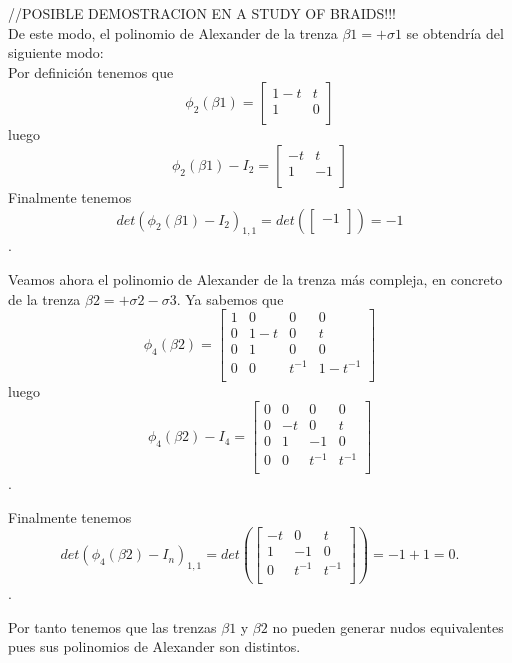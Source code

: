 \documentclass[14pt]{extarticle}
\begin{document}
//POSIBLE DEMOSTRACION EN A STUDY OF BRAIDS!!!\\

De este modo, el polinomio de Alexander de la trenza $\beta1 = +\sigma1$ se obtendría del siguiente modo:\\
Por definición tenemos que  
\[ \phi_{2} (\beta1) = \begin{bmatrix}
1-t & t  \\
1 & 0 \\
\end{bmatrix}\]
luego 
\[ \phi_{2} (\beta1) - I_{2}= \begin{bmatrix}
-t & t  \\
1 & -1 \\
\end{bmatrix}\]
Finalmente tenemos 
\[ det(\phi_{2} (\beta1) - I_{2})_{1,1} = det(\begin{bmatrix}
-1 \\
\end{bmatrix}) = -1\].

Veamos ahora el polinomio de Alexander de la trenza más compleja, en concreto de la trenza $\beta2 = +\sigma2-\sigma3$. Ya sabemos que 
 \[ \phi_{4} (\beta2) = \begin{bmatrix}
 1 & 0 & 0 & 0 \\
 0 & 1-t & 0 & t \\
 0 & 1 & 0 & 0  \\	
 0 & 0 & t^{-1} & 1-t^{-1} \\
 \end{bmatrix}\]
 luego
  \[ \phi_{4} (\beta2) - I_{4} = \begin{bmatrix}
  0 & 0 & 0 & 0 \\
  0 & -t & 0 & t \\
  0 & 1 & -1 & 0  \\	
  0 & 0 & t^{-1} & t^{-1} \\
  \end{bmatrix}\].
  
  Finalmente tenemos 
    \[ det(\phi_{4} (\beta2) - I_{n})_{1,1} = det(\begin{bmatrix}
    -t & 0 & t \\
     1 & -1 & 0  \\	
     0 & t^{-1} & t^{-1} \\
    \end{bmatrix}) = -1+1 = 0.\].
    
Por tanto tenemos que las trenzas $\beta1$ y $\beta2$ no pueden generar nudos equivalentes pues sus polinomios de Alexander son distintos.\\
    
\end{document}
